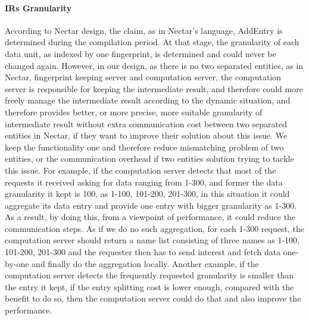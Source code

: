 \paragraph{IRs Granularity}
According to Nectar design, the claim, as in Nectar’s language, AddEntry is determined during the compilation period. At that stage, the granularity of each data unit, as indexed by one fingerprint, is determined and could never be changed again. However, in our design, as there is no two separated entities, as in Nectar, fingerprint keeping server and computation server, the computation server is responsible for keeping the intermediate result, and therefore could more freely manage the intermediate result according to the dynamic situation, and therefore provides better, or more precise, more suitable granularity of intermediate result without extra communication cost between two separated entities in Nectar, if they want to improve their solution about this issue. We keep the functionality one and therefore reduce mismatching problem of two entities, or the communication overhead if two entities solution trying to tackle this issue. For example, if the computation server detects that most of the requests it received asking for data ranging from 1-300, and former the data granularity it kept is 100, as 1-100, 101-200, 201-300, in this situation it could aggregate its data entry and provide one entry with bigger granularity as 1-300. As a result, by doing this, from a viewpoint of performance, it could reduce the communication steps. As if we do no such aggregation, for each 1-300 request, the computation server should return a name list consisting of three names as 1-100, 101-200, 201-300 and the requester then has to send interest and fetch data one-by-one and finally do the aggregation locally. Another example, if the computation server detects the frequently requested granularity is smaller than the entry it kept, if the entry splitting cost is lower enough, compared with the benefit to do so, then the computation server could do that and also improve the performance. 
